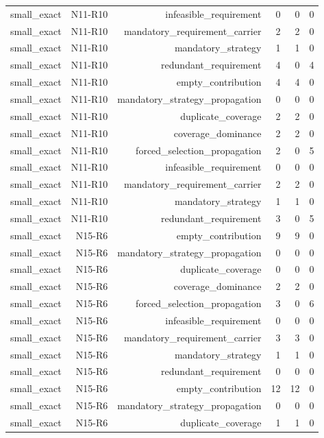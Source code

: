 {\begin{longtable}{lrrrrr}
small\_exact & N11-R10 & infeasible\_requirement & 0 & 0 & 0 \\
small\_exact & N11-R10 & mandatory\_requirement\_carrier & 2 & 2 & 0 \\
small\_exact & N11-R10 & mandatory\_strategy & 1 & 1 & 0 \\
small\_exact & N11-R10 & redundant\_requirement & 4 & 0 & 4 \\
small\_exact & N11-R10 & empty\_contribution & 4 & 4 & 0 \\
small\_exact & N11-R10 & mandatory\_strategy\_propagation & 0 & 0 & 0 \\
small\_exact & N11-R10 & duplicate\_coverage & 2 & 2 & 0 \\
small\_exact & N11-R10 & coverage\_dominance & 2 & 2 & 0 \\
small\_exact & N11-R10 & forced\_selection\_propagation & 2 & 0 & 5 \\
small\_exact & N11-R10 & infeasible\_requirement & 0 & 0 & 0 \\
small\_exact & N11-R10 & mandatory\_requirement\_carrier & 2 & 2 & 0 \\
small\_exact & N11-R10 & mandatory\_strategy & 1 & 1 & 0 \\
small\_exact & N11-R10 & redundant\_requirement & 3 & 0 & 5 \\
small\_exact & N15-R6 & empty\_contribution & 9 & 9 & 0 \\
small\_exact & N15-R6 & mandatory\_strategy\_propagation & 0 & 0 & 0 \\
small\_exact & N15-R6 & duplicate\_coverage & 0 & 0 & 0 \\
small\_exact & N15-R6 & coverage\_dominance & 2 & 2 & 0 \\
small\_exact & N15-R6 & forced\_selection\_propagation & 3 & 0 & 6 \\
small\_exact & N15-R6 & infeasible\_requirement & 0 & 0 & 0 \\
small\_exact & N15-R6 & mandatory\_requirement\_carrier & 3 & 3 & 0 \\
small\_exact & N15-R6 & mandatory\_strategy & 1 & 1 & 0 \\
small\_exact & N15-R6 & redundant\_requirement & 0 & 0 & 0 \\
small\_exact & N15-R6 & empty\_contribution & 12 & 12 & 0 \\
small\_exact & N15-R6 & mandatory\_strategy\_propagation & 0 & 0 & 0 \\
small\_exact & N15-R6 & duplicate\_coverage & 1 & 1 & 0 \\

\end{longtable}}
